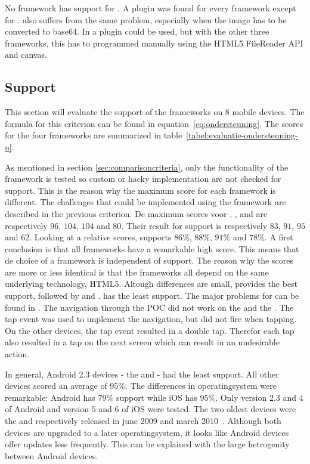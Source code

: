 \documentclass[a4paper]{artikel3}
\begin{document}
No framework has support for .
A plugin was found for every framework except for \lungo{}.
 also suffers from the same problem, especially when the image has to be converted to base64.
In \st{} a plugin could be used, but with the other three frameworks, this has to programmed manually using the HTML5 FileReader API and canvas. 


\subsection{Support} %
\label{sec:evaluation-support}

This section will evaluate the support of the frameworks on $8$ mobile devices.
The formula for this criterion can be found in equation~\ref{eq:ondersteuning}.
The scores for the four frameworks are summarized in table~\ref{tabel:evaluatie-ondersteuning-u}.


As mentioned in section \ref{sec:comparisoncriteria},  only the functionality of the framework is tested so custom or hacky implementation are not checked for support.
This is the reason why the maximum score for each framework is different.
The challenges that could be implemented using the framework are described in the previous criterion.
De maximum scores voor \sta{},  \kendob{},  \jqma{} and \lungo{} are respectively $96$, $104$, $104$ and $80$.
Their result for support is respectively $83$, $91$, $95$ and $62$.
Looking at a relative scores,  \st{} supports $86\%$,  \kendo{} $88\%$,  \jqm{} $91\%$ and \lungo $78\%$.
A first conclusion is that all frameworks have a remarkable high score.
This means that de choice of a framework is independent of support.
The reason why the scores are more or less identical is that the frameworks all depend on the same underlying technology,  HTML5.
Altough differences are small,  \jqma{} provides the best support,  followed by \kendob{} and \sta{}.
\lungo{} has the least support.
The major problems for \lungo{} can be found in .
The navigation through the POC did not work on the \htc{} and the \gtab{}. 
The tap event was used to implement the navigation, but did not fire when tapping.
On the other devices, the tap event resulted in a double tap.
Therefor each tap also resulted in a tap on the next screen which can result in an undesirable action.

In general,  Android 2.3 devices - the \htc{} and \gtab{} - had the least support.
All other devices scored an average of $95\%$.
The differences in operatingsystem were remarkable:  Android has $79\%$ support while iOS has $95\%$.
Only version $2.3$ and $4$ of Android and version $5$ and $6$ of iOS were tested.
The two oldest devices were the \iphoneiii{} and \gs{} respectively released in june 2009 and march 2010~\cite{Staff2009,Gideon2010}.
Although both devices are upgraded to a later operatingsystem,  it looks like Android devices offer updates less frequently.%
This can be explained with the large hetrogenity between Android devices.
\end{document}
